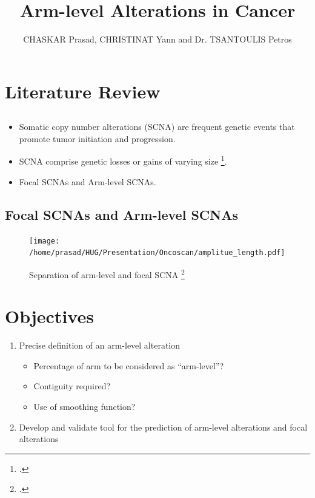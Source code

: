 \documentclass{beamer}
\title{Arm-level Alterations in Cancer}
\author{CHASKAR Prasad, 
CHRISTINAT Yann and Dr. TSANTOULIS Petros}
\begin{document}
{
\begin{frame}
  \titlepage
\end{frame}
}


\section{Literature Review}

		\subsection{}
		
			\begin{frame}{}
			\begin{itemize}
						\pause
						\item Somatic copy number alterations (SCNA) are frequent genetic events that promote tumor initiation and progression.
						\pause
						\item SCNA comprise genetic losses or gains of varying size \footcite {Feuk2006}.
						\pause
						\item Focal SCNAs and Arm-level SCNAs.
			\end{itemize}
			\end{frame}

                \subsection{Focal SCNAs and Arm-level SCNAs}

               \begin{frame}
\begin{figure}
\centering
\texttt{[image: /home/prasad/HUG/Presentation/Oncoscan/amplitue\_length.pdf]}
\caption{Separation of arm-level and focal SCNA \footcite {Mermel2011}}
\label{fig:stream}
\end{figure}
               \end{frame}

\section{Objectives}
		
			\begin{frame}{}
				\begin{flushleft}
			\begin{enumerate}
				\item Precise definition of an arm-level alteration
				\pause
				\begin{itemize}								
					\item Percentage of arm to be considered as ``arm-level''?
					\item Contiguity required?
					\item Use of smoothing function?
				\end{itemize}
				\pause
					\item Develop and validate tool for the prediction of arm-level alterations and focal alterations
			\end{enumerate}
				\end{flushleft}
			\end{frame}
\end{document}
